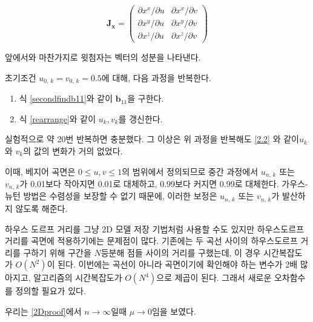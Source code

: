 \documentclass{gshs_thesis}
\theoremstyle{theorem}
\theoremstyle{lemma}
\theoremstyle{definition}
\begin{document}
$$ \mathbf{J}_\mathbf{x} = \begin{pmatrix} \partial x^x / \partial u & \partial x^x / \partial v \\ \partial x^y / \partial u & \partial x^y / \partial v \\ \partial x^z / \partial u & \partial x^z / \partial v \end{pmatrix} $$ 

앞에서와 마찬가지로 윗첨자는 벡터의 성분을 나타낸다.

초기조건 $u_{0, \, k} = v_{0, \, k} = 0.5$에 대해, 다음 과정을 반복한다. 
\begin{enumerate}
	\item 식 \eqref{secondfindb11}와 같이 $\mathbf{b}_{11}$을 구한다. 
	\item 식 \eqref{rearrange}와 같이 $u_k, v_k$를 갱신한다. 
\end{enumerate}
실험적으로 약 20번 반복하면 충분했다. 그 이상은 위 과정을 반복해도 \cref{2.2} 와 같이$u_k$와 $v_k$의 값의 변화가 거의 없었다. 

이때, 베지어 곡면은 $0 \leq u, v \leq 1$의 범위에서 정의되므로 중간 과정에서 $u_{n, \, k}$ 또는 $v_{n, \, k}$가 0.01보다 작아지면 0.01로 대체하고, 0.99보다 커지면 0.99로 대체한다. 가우스-뉴턴 방법은 수렴성을 보장할 수 없기 때문에, 이러한 보정은 $u_{n, \, k}$ 또는 $v_{n, \, k}$가 발산하지 않도록 해준다. 

하우스 도르프 거리를 그냥 2D 모델 저장 기법처럼 사용할 수도 있지만 하우스도르프 거리를 곡면에 적용하기에는 문제점이 많다. 기존에는 두 곡선 사이의 하우스도르프 거리를 구하기 위해 구간을 $N$등분해 점들 사이의 거리를 구했는데, 이 경우 시간복잡도가 $O(N^2)$이 된다. 이번에는 곡선이 아니라 곡면이기에 확인해야 하는 변수가 2배 많아지고, 알고리즘의 시간복잡도가 $O(N^4)$으로 제곱이 된다. 그래서 새로운 오차함수를 정의할 필요가 있다. 

우리는 \cref{2Dproof}에서 $n\to\infty$일때 $\mu\to0$임을 보였다. \\
\end{document}
